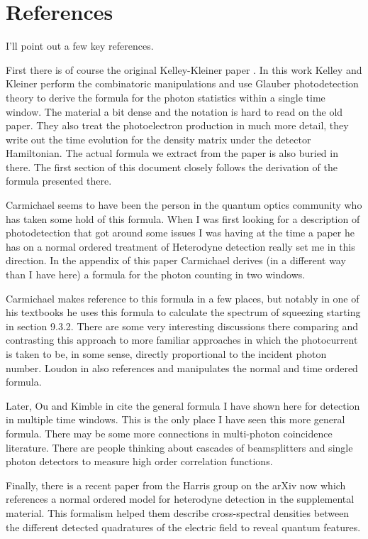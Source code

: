 \documentclass[12pt]{article}
\begin{document}
\section{References}

I'll point out a few key references.

First there is of course the original Kelley-Kleiner paper \cite{Kelley1964}. In this work Kelley and Kleiner perform the combinatoric manipulations and use Glauber photodetection theory \cite{Glauber1963} to derive the formula for the photon statistics within a single time window. The material a bit dense and the notation is hard to read on the old paper. They also treat the photoelectron production in much more detail, they write out the time evolution for the density matrix under the detector Hamiltonian. The actual formula we extract from the paper is also buried in there. The first section of this document closely follows the derivation of the formula presented there.

Carmichael seems to have been the person in the quantum optics community who has taken some hold of this formula. When I was first looking for a description of photodetection that got around some issues I was having at the time a paper he has on a normal ordered  treatment of Heterodyne detection \cite{Carmichael1987} really set me in this direction. In the appendix of this paper Carmichael derives (in a different way than I have here) a formula for the photon counting in two windows. 

Carmichael makes reference to this formula in a few places, but notably in one of his textbooks \cite{Carmichael2009} he uses this formula to calculate the spectrum of squeezing starting in section 9.3.2. There are some very interesting discussions there comparing and contrasting this approach to more familiar approaches in which the photocurrent is taken to be, in some sense, directly proportional to the incident photon number. Loudon in \cite{Loudon2000} also references and manipulates the normal and time ordered formula.

Later, Ou and Kimble in \cite{Ou1995} cite the general formula I have shown here for detection in multiple time windows. This is the only place I have seen this more general formula. There may be some more connections in multi-photon coincidence literature. There are people thinking about cascades of beamsplitters and single photon detectors to measure high order correlation functions.

Finally, there is a recent paper from the Harris group \cite{Shkarin2017} on the arXiv now which references a normal ordered model for heterodyne detection in the supplemental material. This formalism helped them describe cross-spectral densities between the different detected quadratures of the electric field to reveal quantum features.
\end{document}
